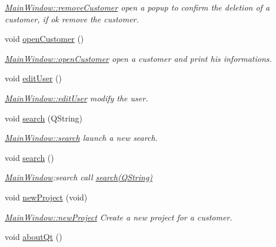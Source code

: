 \begin{DoxyCompactItemize}
\begin{DoxyCompactList}\small\item\em \hyperlink{classMainWindow_adb6fcfe64c3a11f28655e397b3accea9}{Main\+Window\+::remove\+Customer} open a popup to confirm the deletion of a customer, if ok remove the customer. \end{DoxyCompactList}\item 
void \hyperlink{classMainWindow_ad2f2a4051df4fc4776ea4465cf6b6ecb}{open\+Customer} ()
\begin{DoxyCompactList}\small\item\em \hyperlink{classMainWindow_ad2f2a4051df4fc4776ea4465cf6b6ecb}{Main\+Window\+::open\+Customer} open a customer and print his informations. \end{DoxyCompactList}\item 
void \hyperlink{classMainWindow_a32fb574dece506733a3b80d2ccf565ac}{edit\+User} ()
\begin{DoxyCompactList}\small\item\em \hyperlink{classMainWindow_a32fb574dece506733a3b80d2ccf565ac}{Main\+Window\+::edit\+User} modify the user. \end{DoxyCompactList}\item 
void \hyperlink{classMainWindow_aa186e57f984c98ea0266536df32acebd}{search} (Q\+String)
\begin{DoxyCompactList}\small\item\em \hyperlink{classMainWindow_aa186e57f984c98ea0266536df32acebd}{Main\+Window\+::search} launch a new search. \end{DoxyCompactList}\item 
\hypertarget{classMainWindow_a274dd0e068ebdc2a752e7ef05209fb2d}{void \hyperlink{classMainWindow_a274dd0e068ebdc2a752e7ef05209fb2d}{search} ()}\label{classMainWindow_a274dd0e068ebdc2a752e7ef05209fb2d}

\begin{DoxyCompactList}\small\item\em \hyperlink{classMainWindow}{Main\+Window}\+:search call \hyperlink{classMainWindow_aa186e57f984c98ea0266536df32acebd}{search(\+Q\+String)} \end{DoxyCompactList}\item 
void \hyperlink{classMainWindow_a31a63c4615f9c26a6df6e8c3b52967a1}{new\+Project} (void)
\begin{DoxyCompactList}\small\item\em \hyperlink{classMainWindow_a31a63c4615f9c26a6df6e8c3b52967a1}{Main\+Window\+::new\+Project} Create a new project for a customer. \end{DoxyCompactList}\item 
\hypertarget{classMainWindow_a4710d90108bd39f7b80bdc6c3a1b1aef}{void \hyperlink{classMainWindow_a4710d90108bd39f7b80bdc6c3a1b1aef}{about\+Qt} ()}\label{classMainWindow_a4710d90108bd39f7b80bdc6c3a1b1aef}


\end{DoxyCompactItemize}
